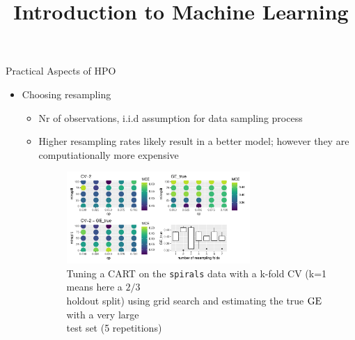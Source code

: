 
\newcommand{\titlefigure}{figure_man/learner_autotuned}
\newcommand{\learninggoals}{
\item Understand the possible design choices for HPO
\item Know termination criteria of HPO}
\usepackage{../../style/lmu-lecture}
\captionsetup[figure]{labelformat=empty, justification=raggedright}%




\title{Introduction to Machine Learning}
\date{}




\sloppy

\begin{vbframe}{Practical Aspects of HPO}
\begin{itemize}
    \item Choosing resampling
    \begin{itemize} 
        \item Nr of observations, i.i.d assumption for data sampling process
        \item Higher resampling rates likely result in a better model; however they are computiationally more expensive \\
        \begin{figure}\includegraphics[width=0.7\textwidth]{figure/resa_hpo.pdf}
        \caption{\footnotesize Tuning a CART on the \texttt{spirals} data with a k-fold CV (k=1 means here a $2/3$ \\ holdout split) using grid search and estimating the true $\mathrm{GE}$ with a very large \\test set (5 repetitions)}
        \end{figure}
    \end{itemize}
\end{itemize}
\end{vbframe}

